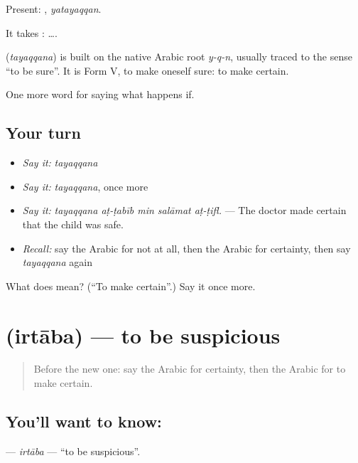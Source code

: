 Present: , \emph{yatayaqqan}.

It takes :   ….

\begin{cousinweb}
\textbf{} (\emph{tayaqqana}) is built on the native Arabic root \emph{y-q-n}, usually traced to the sense \textquotedblleft{}to be sure\textquotedblright{}. It is Form V, to make oneself sure: to make certain.
\end{cousinweb}

\begin{grammarlens}[title={What you've built}]
One more word for saying what happens if.
\end{grammarlens}

\subsection*{Your turn}
\begin{itemize}
\raggedright
  \item \emph{Say it:} \emph{tayaqqana}
  \item \emph{Say it:} \emph{tayaqqana}, once more
  \item \emph{Say it:} \emph{tayaqqana aṭ-ṭabīb min salāmat aṭ-ṭifl.} — The doctor made certain that the child was safe.
  \item \emph{Recall:} say the Arabic for not at all, then the Arabic for certainty, then say \emph{tayaqqana} again
\end{itemize}

\begin{tcolorbox}[breakable,colback=teal!4,colframe=teal!35!black,title={Before you move on}]
What does  mean? (\textquotedblleft{}To make certain\textquotedblright{}.) Say it once more.
\end{tcolorbox}
\section[\texorpdfstring{\ar{ارتاب} (irtāba)}{ارتاب (irtāba)}]{ (irtāba) — to be suspicious}

\label{lesson:AR-C403-irtaba}



\begin{quote}
Before the new one: say the Arabic for certainty, then the Arabic for to make certain.
\end{quote}

\subsection*{You'll want to know: }
\textbf{} — \emph{irtāba} — \textquotedblleft{}to be suspicious\textquotedblright{}.

